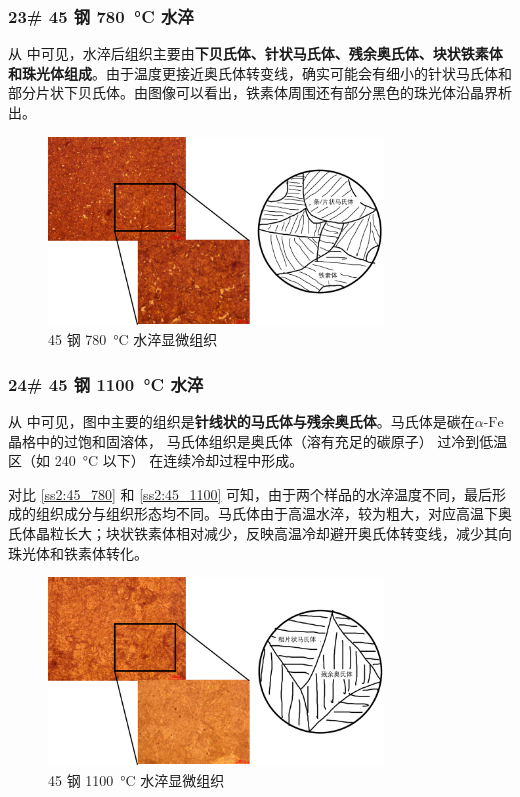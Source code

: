 \documentclass[a4paper,utf8]{article}
\begin{document}
        \subsubsection{23\# 45 钢 \SI{780}{\degreeCelsius} 水淬\label{ss2:45_780}}
            从 中可见，水淬后组织主要由\textbf{下贝氏体、针状马氏体、残余奥氏体、块状铁素体和珠光体组成}。由于温度更接近奥氏体转变线，确实可能会有细小的针状马氏体和部分片状下贝氏体。由图像可以看出，铁素体周围还有部分黑色的珠光体沿晶界析出。
            \begin{figure}[!ht]
                \includegraphics[height=50mm]{result/10.pdf}
                \caption{45 钢 \SI{780}{\degreeCelsius} 水淬显微组织\label{fig:10}}
            \end{figure}

        \subsubsection{24\# 45 钢 \SI{1100}{\degreeCelsius} 水淬\label{ss2:45_1100}}
            从 中可见，图中主要的组织是\textbf{针线状的马氏体与残余奥氏体}。马氏体是碳在$\alpha\text{-Fe}$ 晶格中的过饱和固溶体， 马氏体组织是奥氏体（溶有充足的碳原子） 过冷到低温区（如 \SI{240}{\degreeCelsius} 以下） 在连续冷却过程中形成。\par
            对比 \ref{ss2:45_780} 和 \ref{ss2:45_1100} 可知，由于两个样品的水淬温度不同，最后形成的组织成分与组织形态均不同。马氏体由于高温水淬，较为粗大，对应高温下奥氏体晶粒长大；块状铁素体相对减少，反映高温冷却避开奥氏体转变线，减少其向珠光体和铁素体转化。

            \begin{figure}[!ht]
                \includegraphics[height=50mm]{result/11.pdf}
                \caption{45 钢 \SI{1100}{\degreeCelsius} 水淬显微组织\label{fig:11}}
            \end{figure}
\end{document}
